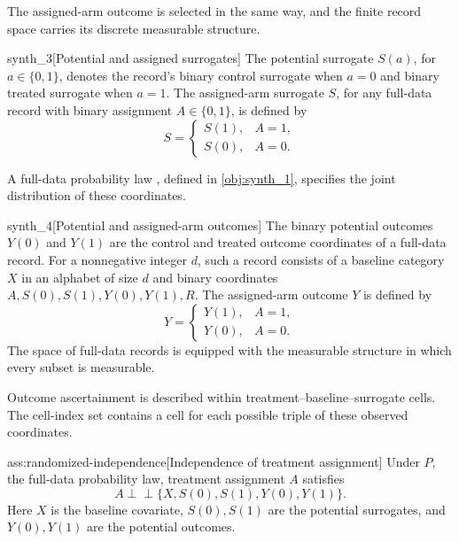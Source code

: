 \documentclass[11pt]{article}
\begin{document}
The assigned-arm outcome  is selected in the same way, and the finite record space carries its discrete measurable structure.

\begin{definitionv}{synth_3}[Potential and assigned surrogates]
The potential surrogate \(S(a)\), for \(a\in\{0,1\}\), denotes the record's binary control surrogate when \(a=0\) and binary treated surrogate when \(a=1\). The assigned-arm surrogate \(S\), for any full-data record with binary assignment \(A\in\{0,1\}\), is defined by
\[
S=
\begin{cases}
S(1), & A=1,\\
S(0), & A=0.
\end{cases}
\]
\end{definitionv}

A full-data probability law , defined in \cref{obj:synth_1}, specifies the joint distribution of these coordinates.

\begin{definitionv}{synth_4}[Potential and assigned-arm outcomes]
The binary potential outcomes \(Y(0)\) and \(Y(1)\) are the control and treated outcome coordinates of a full-data record. For a nonnegative integer \(d\), such a record consists of a baseline category \(X\) in an alphabet of size \(d\) and binary coordinates \(A,S(0),S(1),Y(0),Y(1),R\). The assigned-arm outcome \(Y\) is defined by
\[
Y=
\begin{cases}
Y(1), & A=1,\\
Y(0), & A=0.
\end{cases}
\]
The space of full-data records is equipped with the measurable structure in which every subset is measurable.
\end{definitionv}

Outcome ascertainment is described within treatment--baseline--surrogate cells. The cell-index set  contains a cell  for each possible triple of these observed coordinates.

\begin{assumptionv}{ass:randomized-independence}[Independence of treatment assignment]
Under \(P\), the full-data probability law, treatment assignment \(A\) satisfies
\[
A\perp\!\!\!\perp\{X,S(0),S(1),Y(0),Y(1)\}.
\]
Here \(X\) is the baseline covariate, \(S(0),S(1)\) are the potential surrogates, and \(Y(0),Y(1)\) are the potential outcomes.
\end{assumptionv}
\end{document}
